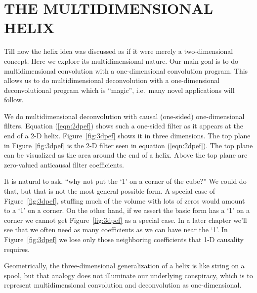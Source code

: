 \section{THE MULTIDIMENSIONAL HELIX}
Till now
the helix idea was discussed
as if it were merely a two-dimensional concept.
Here we explore its multidimensional nature.
Our main goal is to do multidimensional convolution
with a one-dimensional convolution program.
This allows us to do multidimensional deconvolution
with a one-dimensional deconvolutional program
which is ``magic'',
i.e.~many novel applications will follow.


\par
We do multidimensional deconvolution with causal (one-sided)
one-dimensional filters.
Equation (\ref{eqn:2dpef}) shows such a one-sided filter as
it appears at the end of a 2-D helix.
Figure~\ref{fig:3dpef} shows it in three dimensions.
The top plane in Figure~\ref{fig:3dpef} 
is the 2-D filter seen in equation (\ref{eqn:2dpef}).
The top plane can be visualized as the area around the end of a helix.
Above the top plane are zero-valued anticausal filter coefficients.

\par
It is natural to ask,
``why not put the `1' on a corner of the cube?''
We could do that, but that is not the most general possible form.
A special case of Figure~\ref{fig:3dpef},
stuffing much of the volume with lots of zeros
would amount to a `1' on a corner.
On the other hand, if we assert the basic form has a `1' on a corner
we cannot get Figure~\ref{fig:3dpef} as a special case.
In a later chapter we'll see that we often need as many coefficients
as we can have near the `1'.
In Figure~\ref{fig:3dpef} we lose only those neighboring coefficients
that 1-D causality requires.



\par
Geometrically, the three-dimensional generalization of a helix
is like string on a spool,
but that analogy does not illuminate our underlying conspiracy,
which is to represent multidimensional convolution and deconvolution
as one-dimensional.


